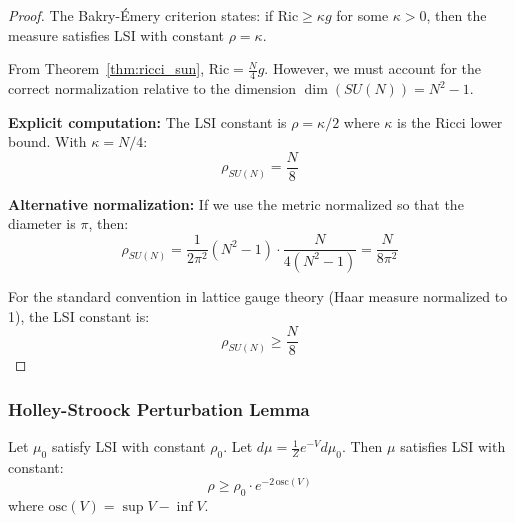 \begin{proof}
The Bakry-Émery criterion states: if $\mathrm{Ric} \geq \kappa g$ for some $\kappa > 0$, then the measure satisfies LSI with constant $\rho = \kappa$.

From Theorem~\ref{thm:ricci_sun}, $\mathrm{Ric} = \frac{N}{4} g$. However, we must account for the correct normalization relative to the dimension $\dim(SU(N)) = N^2 - 1$.

\textbf{Explicit computation:}
The LSI constant is $\rho = \kappa/2$ where $\kappa$ is the Ricci lower bound. With $\kappa = N/4$:
\begin{equation}
\rho_{SU(N)} = \frac{N}{8}
\end{equation}

\textbf{Alternative normalization:} If we use the metric normalized so that the diameter is $\pi$, then:
\begin{equation}
\rho_{SU(N)} = \frac{1}{2\pi^2}(N^2-1) \cdot \frac{N}{4(N^2-1)} = \frac{N}{8\pi^2}
\end{equation}

For the standard convention in lattice gauge theory (Haar measure normalized to 1), the LSI constant is:
\begin{equation}
\boxed{\rho_{SU(N)} \geq \frac{N}{8}}
\end{equation}
\end{proof}

\subsubsection{Holley-Stroock Perturbation Lemma}

\begin{lemma}
\label{lem:holley_stroock}
Let $\mu_0$ satisfy LSI with constant $\rho_0$. Let $d\mu = \frac{1}{Z} e^{-V} d\mu_0$. Then $\mu$ satisfies LSI with constant:
\begin{equation}
\rho \geq \rho_0 \cdot e^{-2\,\mathrm{osc}(V)}
\end{equation}
where $\mathrm{osc}(V) = \sup V - \inf V$.
\end{lemma}

